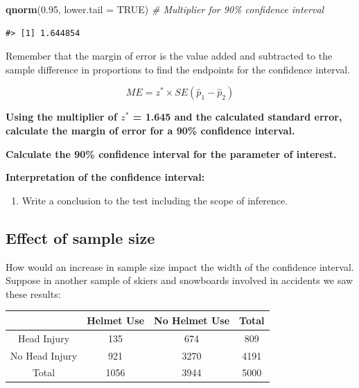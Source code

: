 \documentclass[
]{report}
\newenvironment{Shaded}{\begin{snugshade}}{\end{snugshade}}
\newcommand{\AttributeTok}[1]{\textcolor[rgb]{0.13,0.29,0.53}{#1}}
\newcommand{\CommentTok}[1]{\textcolor[rgb]{0.56,0.35,0.01}{\textit{#1}}}
\newcommand{\ConstantTok}[1]{\textcolor[rgb]{0.56,0.35,0.01}{#1}}
\newcommand{\FloatTok}[1]{\textcolor[rgb]{0.00,0.00,0.81}{#1}}
\newcommand{\FunctionTok}[1]{\textcolor[rgb]{0.13,0.29,0.53}{\textbf{#1}}}
\newcommand{\NormalTok}[1]{#1}
\newcounter{none} %
\providecommand{\tightlist}{%
  \setlength{\itemsep}{0pt}\setlength{\parskip}{0pt}}
\begin{document}
\begin{Shaded}
\begin{Highlighting}[]
\FunctionTok{qnorm}\NormalTok{(}\FloatTok{0.95}\NormalTok{, }\AttributeTok{lower.tail =} \ConstantTok{TRUE}\NormalTok{) }\CommentTok{\# Multiplier for 90\% confidence interval}
\end{Highlighting}
\end{Shaded}

\begin{verbatim}
#> [1] 1.644854
\end{verbatim}

Remember that the margin of error is the value added and subtracted to the sample difference in proportions to find the endpoints for the confidence interval.

\[ME = z^*\times SE(\hat{p}_1 - \hat{p}_2)\]

\textbf{Using the multiplier of \(z^*\) = 1.645 and the calculated standard error, calculate the margin of error for a 90\% confidence interval.}

\vspace{0.8in}

\textbf{Calculate the 90\% confidence interval for the parameter of interest.}

\vspace{1in}

\textbf{Interpretation of the confidence interval:}

\vspace{1in}

\begin{enumerate}
\def\labelenumi{\arabic{enumi}.}
\setcounter{enumi}{3}
\tightlist
\item
  Write a conclusion to the test including the scope of inference.
\end{enumerate}

\vspace{1in}

\newpage

\subsection{Effect of sample size}\label{effect-of-sample-size}

How would an increase in sample size impact the width of the confidence interval. Suppose in another sample of skiers and snowboards involved in accidents we saw these results:

{\def\LTcaptype{none} %
\begin{longtable}[]{@{}cccc@{}}
\toprule\noalign{}
& Helmet Use & No Helmet Use & Total \\
\midrule\noalign{}
\endhead
\bottomrule\noalign{}
\endlastfoot
Head Injury & 135 & 674 & 809 \\
No Head Injury & 921 & 3270 & 4191 \\
Total & 1056 & 3944 & 5000 \\
\end{longtable}
}
\end{document}
